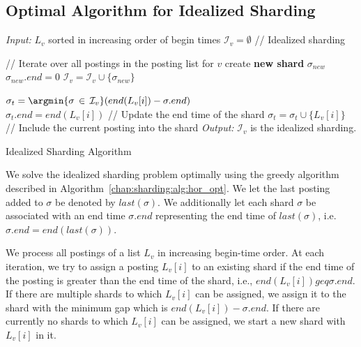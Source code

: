 \subsection{Optimal Algorithm for Idealized Sharding}
\label{susec:idealized_algo}

 \begin{algorithm}[htb]
   \small
   \begin{algorithmic}[1]
     \STATE  \emph{Input:} $L_v$ sorted in increasing order of begin times
    \STATE $\mathcal{I}_v = \emptyset$ \quad // Idealized sharding
 	
 	\STATE {} 
	\STATE // Iterate over all postings in the posting list for $v$
        		\STATE create \textbf{new shard} $\sigma_{new}$ \\
			\STATE $\sigma_{new}.end = 0$
                        \STATE $\mathcal{I}_v = \mathcal{I}_v \cup \{\sigma_{new}\}$
        \ENDIF

\STATE $\sigma_{t} =\argmin{\sigma\, \in \,\mathcal{I}_v} (end(L_v[i]) - \sigma.end)$ \\
        
\STATE $\sigma_{t}.end = end(L_v[i])$ // Update the end time of the shard
		\STATE $\sigma_{t} = \sigma_{t}  \cup \{L_v [i]\}$	// Include the current posting into the shard
\STATE
   	\ENDFOR
\STATE
\STATE\emph{Output:} $\mathcal{I}_v$  is the idealized sharding.

   \end{algorithmic}
   \caption{Idealized Sharding Algorithm}
   \label{chap:sharding:alg:hor_opt}
 \end{algorithm}

We solve the idealized sharding problem optimally using the greedy  
algorithm described in Algorithm~\ref{chap:sharding:alg:hor_opt}. We let the last posting added to $\sigma$ be denoted by $last(\sigma)$. We additionally let each shard $\sigma$ be associated with an end time $\sigma.end$ representing the end time of $last(\sigma)$, i.e. $\sigma.end = end(last(\sigma))$.

We process all postings of a list $L_{v}$ in increasing begin-time order. At each iteration, we try to assign a posting $L_{v}[i]$ to an existing shard if the end time of the posting is greater than the end time of the shard, i.e., $end(L_{v}[i]) geq \sigma.end$. If there are multiple shards to which $L_{v}[i]$ can be assigned, we
 assign it to the shard with the minimum gap which is $end(L_{v}[i]) - \sigma.end$. If there are currently no shards to which $L_{v}[i]$ can be assigned, we start a new shard with $L_{v}[i]$ in it. 

